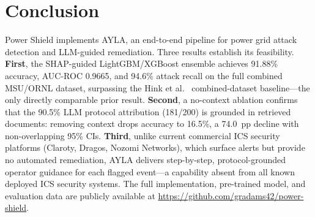 \documentclass[twocolumn, 10pt, letterpaper]{article}
\begin{document}
\section{Conclusion}
\label{sec:conclusion}

Power Shield implements AYLA, an end-to-end pipeline for power grid attack
detection and LLM-guided remediation.
Three results establish its feasibility.
\textbf{First}, the SHAP-guided LightGBM/XGBoost ensemble achieves 91.88\%
accuracy, AUC-ROC 0.9665, and 94.6\% attack recall on the full combined
MSU/ORNL dataset, surpassing the Hink et al.\ \cite{hink2014ml} combined-dataset
baseline---the only directly comparable prior result.
\textbf{Second}, a no-context ablation confirms that the 90.5\% LLM protocol
attribution (181/200) is grounded in retrieved documents: removing context drops
accuracy to 16.5\%, a 74.0~pp decline with non-overlapping 95\% CIs.
\textbf{Third}, unlike current commercial ICS security platforms (Claroty, Dragos,
Nozomi Networks), which surface alerts but provide no automated remediation,
AYLA delivers step-by-step, protocol-grounded operator guidance for each
flagged event---a capability absent from all known deployed ICS security systems.
The full implementation, pre-trained model, and evaluation data are publicly
available at \url{https://github.com/gradams42/power-shield}.

\clearpage


\end{document}
